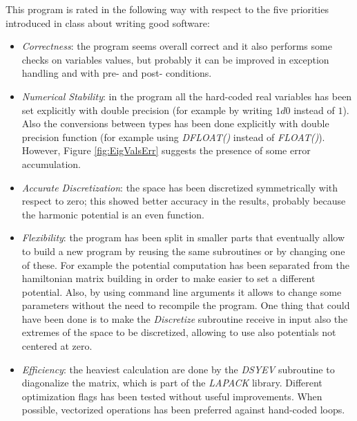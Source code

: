 \documentclass[11pt,a4paper]{article}
\begin{document}
This program is rated in the following way with respect to the five priorities introduced in class about writing good software:
\begin{itemize}
	\item \textit{Correctness}: the program seems overall correct and it also performs some checks on variables values, but probably it can be improved in exception handling and with pre- and post- conditions.
	\item \textit{Numerical Stability}: in the program all the hard-coded real variables has been set explicitly with double precision (for example by writing $1d0$ instead of $1$). 
	Also the conversions between types has been done explicitly with double precision function (for example using \textit{DFLOAT()} instead of \textit{FLOAT()}). 
	However, Figure \ref{fig:EigValsErr} suggests the presence of some error accumulation.
	\item \textit{Accurate Discretization}: the space has been discretized symmetrically with respect to zero; this showed better accuracy in the results, probably because the harmonic potential is an even function. 
	\item \textit{Flexibility}: the program has been split in smaller parts that eventually allow to build a new program by reusing the same subroutines or by changing one of these. 
	For example the potential computation has been separated from the hamiltonian matrix building in order to make easier to set a different potential. 
	Also, by using command line arguments it allows to change some parameters without the need to recompile the program.
	One thing that could have been done is to make the \textit{Discretize} subroutine receive in input also the extremes of the space to be discretized, allowing to use also potentials not centered at zero.
	\item \textit{Efficiency}: the heaviest calculation are done by the \textit{DSYEV} subroutine to diagonalize the matrix, which is part of the \textit{LAPACK} library. 
	Different optimization flags has been tested without useful improvements.
	When possible, vectorized operations has been preferred against hand-coded loops.
\end{itemize}
	
\end{document}
